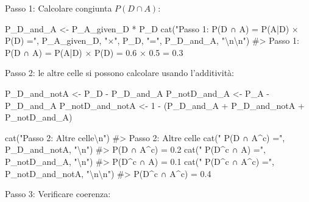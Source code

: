 \documentclass[
  letterpaper,
  DIV=11,
  numbers=noendperiod,
  oneside]{scrreprt}
\newenvironment{Shaded}{\begin{snugshade}}{\end{snugshade}}
\newcommand{\CommentTok}[1]{\textcolor[rgb]{0.37,0.37,0.37}{#1}}
\newcommand{\DecValTok}[1]{\textcolor[rgb]{0.68,0.00,0.00}{#1}}
\newcommand{\FunctionTok}[1]{\textcolor[rgb]{0.28,0.35,0.67}{#1}}
\newcommand{\NormalTok}[1]{\textcolor[rgb]{0.00,0.23,0.31}{#1}}
\newcommand{\OtherTok}[1]{\textcolor[rgb]{0.00,0.23,0.31}{#1}}
\newcommand{\SpecialCharTok}[1]{\textcolor[rgb]{0.37,0.37,0.37}{#1}}
\newcommand{\StringTok}[1]{\textcolor[rgb]{0.13,0.47,0.30}{#1}}
\theoremstyle{definition}
\theoremstyle{plain}
\theoremstyle{definition}
\theoremstyle{remark}
\begin{document}
Passo 1: Calcolare congiunta \(P(D \cap A)\):

\begin{Shaded}
\begin{Highlighting}[]
\NormalTok{P\_D\_and\_A }\OtherTok{\textless{}{-}}\NormalTok{ P\_A\_given\_D }\SpecialCharTok{*}\NormalTok{ P\_D}
\FunctionTok{cat}\NormalTok{(}\StringTok{"Passo 1: P(D ∩ A) = P(A|D) × P(D) ="}\NormalTok{, P\_A\_given\_D, }\StringTok{"×"}\NormalTok{, P\_D, }\StringTok{"="}\NormalTok{, P\_D\_and\_A, }\StringTok{"}\SpecialCharTok{\textbackslash{}n\textbackslash{}n}\StringTok{"}\NormalTok{)}
\CommentTok{\#\textgreater{} Passo 1: P(D ∩ A) = P(A|D) × P(D) = 0.6 × 0.5 = 0.3}
\end{Highlighting}
\end{Shaded}

Passo 2: le altre celle si possono calcolare usando l'additività:

\begin{Shaded}
\begin{Highlighting}[]
\NormalTok{P\_D\_and\_notA }\OtherTok{\textless{}{-}}\NormalTok{ P\_D }\SpecialCharTok{{-}}\NormalTok{ P\_D\_and\_A}
\NormalTok{P\_notD\_and\_A }\OtherTok{\textless{}{-}}\NormalTok{ P\_A }\SpecialCharTok{{-}}\NormalTok{ P\_D\_and\_A}
\NormalTok{P\_notD\_and\_notA }\OtherTok{\textless{}{-}} \DecValTok{1} \SpecialCharTok{{-}}\NormalTok{ (P\_D\_and\_A }\SpecialCharTok{+}\NormalTok{ P\_D\_and\_notA }\SpecialCharTok{+}\NormalTok{ P\_notD\_and\_A)}

\FunctionTok{cat}\NormalTok{(}\StringTok{"Passo 2: Altre celle}\SpecialCharTok{\textbackslash{}n}\StringTok{"}\NormalTok{)}
\CommentTok{\#\textgreater{} Passo 2: Altre celle}
\FunctionTok{cat}\NormalTok{(}\StringTok{"  P(D ∩ A\^{}c) ="}\NormalTok{, P\_D\_and\_notA, }\StringTok{"}\SpecialCharTok{\textbackslash{}n}\StringTok{"}\NormalTok{)}
\CommentTok{\#\textgreater{}   P(D ∩ A\^{}c) = 0.2}
\FunctionTok{cat}\NormalTok{(}\StringTok{"  P(D\^{}c ∩ A) ="}\NormalTok{, P\_notD\_and\_A, }\StringTok{"}\SpecialCharTok{\textbackslash{}n}\StringTok{"}\NormalTok{)}
\CommentTok{\#\textgreater{}   P(D\^{}c ∩ A) = 0.1}
\FunctionTok{cat}\NormalTok{(}\StringTok{"  P(D\^{}c ∩ A\^{}c) ="}\NormalTok{, P\_notD\_and\_notA, }\StringTok{"}\SpecialCharTok{\textbackslash{}n\textbackslash{}n}\StringTok{"}\NormalTok{)}
\CommentTok{\#\textgreater{}   P(D\^{}c ∩ A\^{}c) = 0.4}
\end{Highlighting}
\end{Shaded}

Passo 3: Verificare coerenza:
\end{document}
